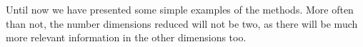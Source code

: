 Until now we have presented some simple examples of the methods. More often than not, the number dimensions reduced will not be two, as there will be much more relevant information in the other dimensions too.

